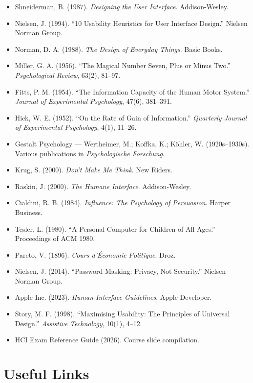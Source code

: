 \documentclass[12pt,a4paper]{report}
\begin{document}
\begin{itemize}[leftmargin=*, itemsep=6pt]
  \item Shneiderman, B. (1987). \textit{Designing the User Interface}. Addison-Wesley.
  \item Nielsen, J. (1994). ``10 Usability Heuristics for User Interface Design.''
        Nielsen Norman Group.
  \item Norman, D. A. (1988). \textit{The Design of Everyday Things}. Basic Books.
  \item Miller, G. A. (1956). ``The Magical Number Seven, Plus or Minus Two.''
        \textit{Psychological Review}, 63(2), 81--97.
  \item Fitts, P. M. (1954). ``The Information Capacity of the Human Motor System.''
        \textit{Journal of Experimental Psychology}, 47(6), 381--391.
  \item Hick, W. E. (1952). ``On the Rate of Gain of Information.''
        \textit{Quarterly Journal of Experimental Psychology}, 4(1), 11--26.
  \item Gestalt Psychology — Wertheimer, M.; Koffka, K.; Köhler, W. (1920s–1930s).
        Various publications in \textit{Psychologische Forschung}.
  \item Krug, S. (2000). \textit{Don't Make Me Think}. New Riders.
  \item Raskin, J. (2000). \textit{The Humane Interface}. Addison-Wesley.
  \item Cialdini, R. B. (1984). \textit{Influence: The Psychology of Persuasion}. Harper Business.
  \item Tesler, L. (1980). ``A Personal Computer for Children of All Ages.''
        Proceedings of ACM 1980.
  \item Pareto, V. (1896). \textit{Cours d'Économie Politique}. Droz.
  \item Nielsen, J. (2014). ``Password Masking: Privacy, Not Security.''
        Nielsen Norman Group.
  \item Apple Inc. (2023). \textit{Human Interface Guidelines}. Apple Developer.
  \item Story, M. F. (1998). ``Maximising Usability: The Principles of Universal Design.''
        \textit{Assistive Technology}, 10(1), 4--12.
  \item HCI Exam Reference Guide (2026). Course slide compilation.
\end{itemize}

\section{Useful Links}
\end{document}
